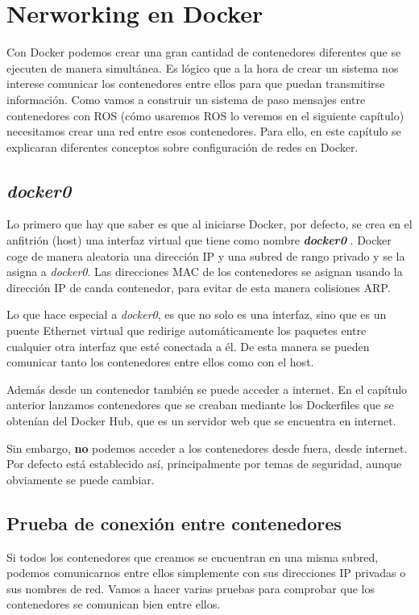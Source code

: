 \chapter{Nerworking en Docker}
Con Docker podemos crear una gran cantidad de contenedores diferentes que se ejecuten de manera simultánea. Es lógico que a la hora de crear un sistema nos interese comunicar los contenedores entre ellos para que puedan transmitirse información. Como vamos a construir un sistema de paso mensajes entre contenedores con ROS (cómo usaremos ROS lo veremos en el siguiente capítulo) necesitamos crear una red entre esos contenedores. Para ello, en este capítulo se explicaran diferentes conceptos sobre configuración de redes en Docker.

	\section{\textit{docker0}}
	Lo primero que hay que saber es que al iniciarse Docker, por defecto, se crea en el anfitrión (host) una interfaz virtual que tiene como nombre \textbf{\emph{docker0}} \cite{docker-network-advanced}. Docker coge de manera aleatoria una dirección IP y una subred de rango privado y se la asigna a \emph{docker0}. Las direcciones MAC de los contenedores se asignan usando la dirección IP de canda contenedor, para evitar de esta manera colisiones ARP.
	
	Lo que hace especial a \emph{docker0}, es que no solo es una interfaz, sino que es un puente Ethernet virtual que redirige automáticamente los paquetes entre cualquier otra interfaz que esté conectada a él. De esta manera se pueden comunicar tanto los contenedores entre ellos como con el host.
	
	Además desde un contenedor también se puede acceder a internet. En el capítulo anterior lanzamos contenedores que se creaban mediante los Dockerfiles que se obtenían del Docker Hub, que es un servidor web que se encuentra en internet. 
	
	Sin embargo, \textbf{no} podemos acceder a los contenedores desde fuera, desde internet. Por defecto está 
	establecido así, principalmente por temas de seguridad, aunque obviamente se puede cambiar.
	
	\section{Prueba de conexión entre contenedores}
	Si todos los contenedores que creamos se encuentran en una misma subred, podemos comunicarnos entre ellos simplemente con sus direcciones IP privadas o sus nombres de red. Vamos a hacer varias pruebas para comprobar que los contenedores se comunican bien entre ellos.
	
